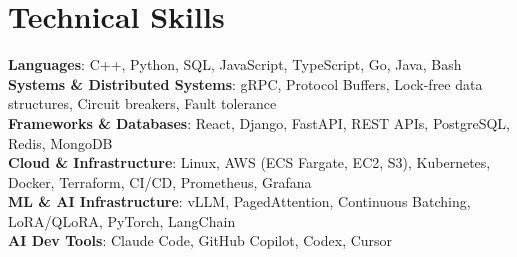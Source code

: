\documentclass[letterpaper,11pt]{article}
\begin{document}
\section{Technical Skills}
\vspace{-7pt}
\begin{itemize}
[leftmargin=0.15in, label={}]\small{\item{
        \textbf{Languages}{: C++, Python, SQL, JavaScript, TypeScript, Go, Java, Bash} \\
        \textbf{Systems \& Distributed Systems}{: gRPC, Protocol Buffers, Lock-free data structures, Circuit breakers, Fault tolerance} \\
        \textbf{Frameworks \& Databases}{: React, Django, FastAPI, REST APIs, PostgreSQL, Redis, MongoDB} \\
        \textbf{Cloud \& Infrastructure}{: Linux, AWS (ECS Fargate, EC2, S3), Kubernetes, Docker, Terraform, CI/CD, Prometheus, Grafana} \\
        \textbf{ML \& AI Infrastructure}{: vLLM, PagedAttention, Continuous Batching, LoRA/QLoRA, PyTorch, LangChain} \\
        \textbf{AI Dev Tools}{: Claude Code, GitHub Copilot, Codex, Cursor} \\
}}
\end{itemize}
\end{document}
